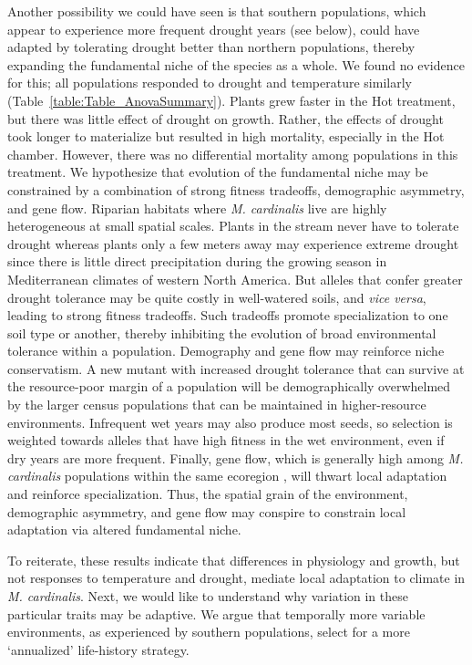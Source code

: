 \documentclass[11pt, oneside]{article}
\begin{document}
Another possibility we could have seen is that southern populations, which appear to experience more frequent drought years (see below), could have adapted by tolerating drought better than northern populations, thereby expanding the fundamental niche of the species as a whole. We found no evidence for this; all populations responded to drought and temperature similarly (Table~\ref{table:Table_AnovaSummary}). Plants grew faster in the Hot treatment, but there was little effect of drought on growth. Rather, the effects of drought took longer to materialize but resulted in high mortality, especially in the Hot chamber. However, there was no differential mortality among populations in this treatment. We hypothesize that evolution of the fundamental niche may be constrained by a combination of strong fitness tradeoffs, demographic asymmetry, and gene flow. Riparian habitats where \textit{M. cardinalis} live are highly heterogeneous at small spatial scales. Plants in the stream never have to tolerate drought whereas plants only a few meters away may experience extreme drought since there is little direct precipitation during the growing season in Mediterranean climates of western North America. But alleles that confer greater drought tolerance may be quite costly in well-watered soils, and \textit{vice versa}, leading to strong fitness tradeoffs. Such tradeoffs promote specialization to one soil type or another, thereby inhibiting the evolution of broad environmental tolerance within a population. Demography and gene flow may reinforce niche conservatism. A new mutant with increased drought tolerance that can survive at the resource-poor margin of a population will be demographically overwhelmed by the larger census populations that can be maintained in higher-resource environments. Infrequent wet years may also produce most seeds, so selection is weighted towards alleles that have high fitness in the wet environment, even if dry years are more frequent. Finally, gene flow, which is generally high among \textit{M. cardinalis} populations within the same ecoregion \citep{Paul_etal_2016}, will thwart local adaptation and reinforce specialization. Thus, the spatial grain of the environment, demographic asymmetry, and gene flow may conspire to constrain local adaptation via altered fundamental niche.

To reiterate, these results indicate that differences in physiology and growth, but not responses to temperature and drought, mediate local adaptation to climate in \textit{M. cardinalis}. Next, we would like to understand why variation in these particular traits may be adaptive. We argue that temporally more variable environments, as experienced by southern populations, select for a more ‘annualized’ life-history strategy. 
\end{document}
